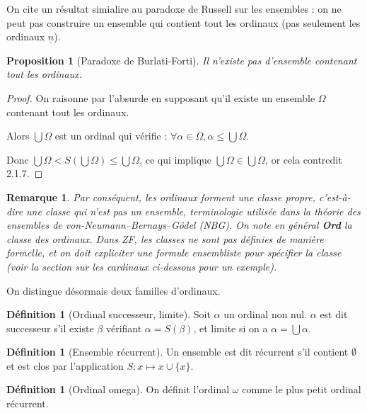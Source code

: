 \documentclass[french]{article}
\theoremstyle{definition}
\newtheorem{definition}[subsubsection]{Définition}
\theoremstyle{plain}
\newtheorem{proposition}[subsubsection]{Proposition}
\theoremstyle{plain}
\theoremstyle{plain}
\theoremstyle{plain}
\newtheorem{remark}[subsubsection]{Remarque}
\theoremstyle{plain}
\begin{document}
\par On cite un résultat simialire au paradoxe de Russell sur les ensembles : on ne peut pas construire un ensemble qui contient tout les ordinaux (pas seulement les ordinaux \( \underline{n} \)).

\begin{proposition}[Paradoxe de Burlati-Forti]
	Il n'existe pas d'ensemble contenant tout les ordinaux.
\end{proposition}
\begin{proof}
	On raisonne par l'absurde en supposant qu'il existe un ensemble \( \Omega \) contenant tout les ordinaux.
	
	Alors \( \bigcup \Omega \) est un ordinal qui vérifie : \( \forall \alpha \in \Omega, \alpha \le \bigcup \Omega \). 

	Donc \( \bigcup\Omega < S(\bigcup\Omega) \le \bigcup\Omega \), ce qui implique \( \bigcup\Omega \in \bigcup\Omega \), or cela contredit 2.1.7.
\end{proof}

\begin{remark}
	Par conséquent, les ordinaux forment une \textit{classe propre}, c'est-à-dire une classe qui n'est pas un ensemble, terminologie utilisée dans la théorie des ensembles de von-Neumann–Bernays–Gödel (NBG). On note en général \textbf{Ord} la classe des ordinaux. 
	Dans ZF, les classes ne sont pas définies de manière formelle, et on doit expliciter une formule ensembliste pour spécifier la classe (voir la section sur les cardinaux ci-dessous pour un exemple). 

\end{remark}
\par On distingue désormais deux familles d'ordinaux.
\begin{definition}[Ordinal successeur, limite]
	Soit \( \alpha \) un ordinal non nul. \( \alpha \) est dit successeur s'il existe \( \beta \) vérifiant \( \alpha = S(\beta) \), et limite si on a \( \alpha = \bigcup \alpha \).
\end{definition}

\begin{definition}[Ensemble récurrent]
	Un ensemble est dit récurrent s'il contient \( \emptyset \) et est clos par l'application \( S : x \mapsto x \cup \{x\} \).
\end{definition}
\begin{definition}[Ordinal omega]
	On définit l'ordinal \( \omega \) comme le plus petit ordinal récurrent.
\end{definition}
\end{document}
